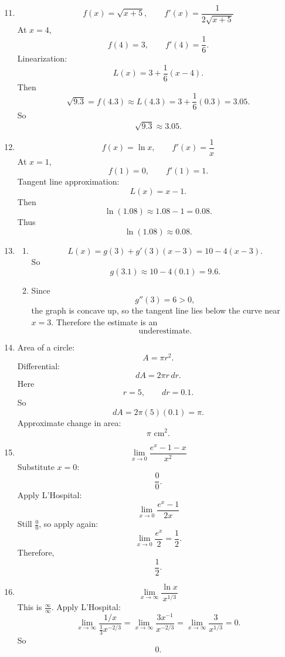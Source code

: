 \documentclass[11pt]{article}
\begin{document}
\begin{enumerate}
    \setcounter{enumi}{10}

    \item 
    \[
    f(x)=\sqrt{x+5},\qquad f'(x)=\frac{1}{2\sqrt{x+5}}
    \]
    At \(x=4\),
    \[
    f(4)=3,\qquad f'(4)=\frac16.
    \]
    Linearization:
    \[
    L(x)=3+\frac16(x-4).
    \]
    Then
    \[
    \sqrt{9.3}=f(4.3)\approx L(4.3)=3+\frac16(0.3)=3.05.
    \]
    So
    \[
    \boxed{\sqrt{9.3}\approx 3.05.}
    \]

    \item 
    \[
    f(x)=\ln x,\qquad f'(x)=\frac1x
    \]
    At \(x=1\),
    \[
    f(1)=0,\qquad f'(1)=1.
    \]
    Tangent line approximation:
    \[
    L(x)=x-1.
    \]
    Then
    \[
    \ln(1.08)\approx 1.08-1=0.08.
    \]
    Thus
    \[
    \boxed{\ln(1.08)\approx 0.08.}
    \]

    \item 
    \begin{enumerate}
        \item
        \[
        L(x)=g(3)+g'(3)(x-3)=10-4(x-3).
        \]
        So
        \[
        g(3.1)\approx 10-4(0.1)=9.6.
        \]
        \item Since
        \[
        g''(3)=6>0,
        \]
        the graph is concave up, so the tangent line lies below the curve near \(x=3\). Therefore the estimate is an
        \[
        \boxed{\text{underestimate}.}
        \]
    \end{enumerate}

    \item 
    Area of a circle:
    \[
    A=\pi r^2.
    \]
    Differential:
    \[
    dA=2\pi r\,dr.
    \]
    Here
    \[
    r=5,\qquad dr=0.1.
    \]
    So
    \[
    dA=2\pi(5)(0.1)=\pi.
    \]
    Approximate change in area:
    \[
    \boxed{\pi\text{ cm}^2.}
    \]

    \item 
    \[
    \lim_{x\to 0}\frac{e^x-1-x}{x^2}
    \]
    Substitute \(x=0\):
    \[
    \frac{0}{0}.
    \]
    Apply L'Hospital:
    \[
    \lim_{x\to 0}\frac{e^x-1}{2x}
    \]
    Still \(\frac00\), so apply again:
    \[
    \lim_{x\to 0}\frac{e^x}{2}=\frac12.
    \]
    Therefore,
    \[
    \boxed{\frac12}.
    \]

    \item 
    \[
    \lim_{x\to\infty}\frac{\ln x}{x^{1/3}}
    \]
    This is \(\frac{\infty}{\infty}\). Apply L'Hospital:
    \[
    \lim_{x\to\infty}\frac{1/x}{\frac13 x^{-2/3}}
    =
    \lim_{x\to\infty}\frac{3x^{-1}}{x^{-2/3}}
    =
    \lim_{x\to\infty}\frac{3}{x^{1/3}}=0.
    \]
    So
    \[
    \boxed{0}.
    \]


\end{enumerate}
\end{document}
